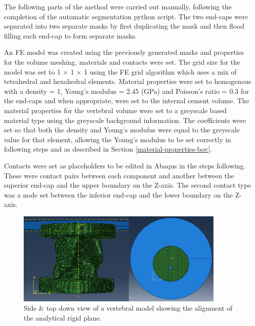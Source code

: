 The following parts of the method were carried out manually, following the
completion of the automatic segmentation python script. The two end-caps were
separated into two separate masks by first duplicating the mask and then flood
filling each end-cap to form separate masks.

An FE model was created using the previously generated masks and properties for
the volume meshing, materials and contacts were set. The grid size for the
model was set to 1 $\times$ 1 $\times$ 1 using the FE grid algorithm which uses
a mix of tetrahedral and hexahedral elements. Material properties were set to
homogenous with a density = 1, Young's modulus = 2.45 (GPa) and Poisson's ratio
= 0.3 for the end-caps and when appropriate, were set to the internal cement
volume. The material properties for the vertebral volume were set to a
greyscale based material type using the greyscale background information. The
coefficients were set so that both the density and Young's modulus were equal
to the greyscale value for that element, allowing the Young's modulus to be set
correctly in following steps and as described in Section
\ref{material-properties-bov}.

Contacts were set as placeholders to be edited in Abaqus in the steps
following. These were contact pairs between each component and another between
the superior end-cap and the upper boundary on the Z-axis. The second contact
type was a node set between the inferior end-cap and the lower boundary on the
Z-axis.

\begin{figure}[ht!]
\centering

  \includegraphics[width=4in]{images/abaqus_side_view_Both.png}
  \caption{Side \& top down view of a vertebral model showing the alignment of the analytical rigid plane.}
\label{fig:abaqus_top_view}
\end{figure}


